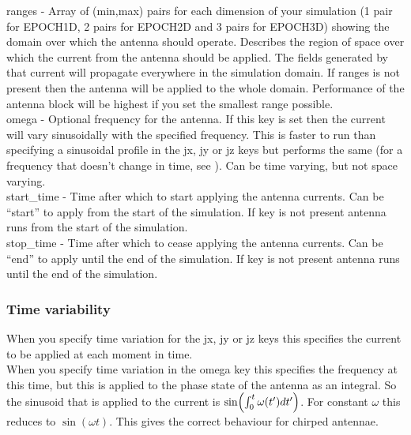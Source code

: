 {\emphtext ranges} - Array of (min,max) pairs for each dimension of your
  simulation (1 pair for EPOCH1D, 2 pairs for EPOCH2D and 3 pairs for EPOCH3D)
  showing the domain over which the antenna should operate. Describes the region
  of space over which the current from the antenna should be applied. The fields
  generated by that current will propagate everywhere in the simulation domain.
  If ranges is not present then the antenna will be applied to the whole domain.
  Performance of the antenna block will be highest if you set the smallest range
  possible.\\

{\emphtext omega} -  Optional frequency for the antenna. If this key is set
  then the current will vary sinusoidally with the specified frequency. This is
  faster to run than specifying a sinusoidal profile in the jx, jy or jz keys
  but performs the same (for a frequency that doesn't change in time, see
  ). Can be time varying, but not space varying.\\

{\emphtext start\_time} -  Time after which to start applying the antenna
  currents. Can be ``start'' to apply from the start of the simulation. If key
  is not present antenna runs from the start of the simulation.\\

{\emphtext stop\_time} - Time after which to cease applying the antenna
  currents. Can be ``end'' to apply until the end of the simulation. If key is
  not present antenna runs until the end of the simulation.\\

\subsubsection{Time variability}
\label{sec:time_variability}
When you specify time variation for the jx, jy or jz keys this specifies the
 current to be applied at each moment in time.\\

When you specify time variation in the omega key this specifies the frequency
at this time, but this is applied to the phase state of the antenna as an
integral. So the sinusoid that is applied to the current is
$\sin\Bigl(\int_0^t\omega(t')dt'\Bigr)$. For constant $\omega$ this reduces to
$\sin(\omega t)$. This gives the correct behaviour for chirped antennae.\\

